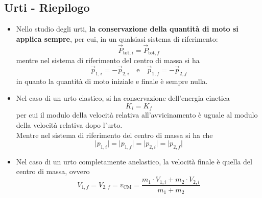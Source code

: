 \documentclass[a4paper]{extarticle}
\begin{document}
\vspace{1em}
\subsection{Urti - Riepilogo}
\begin{itemize}
  \item Nello studio degli urti, \textbf{la conservazione della quantità di moto si applica sempre}, per cui, in un qualsiasi sistema di riferimento:
  \[\boxed{\vec P_{\text{tot}, i} = \vec P_{\text{tot}, f}}\]
  mentre nel sistema di riferimento del centro di massa si ha
  \[\boxed{\vec p_{1,i} = - \vec p_{2,i}} \hspace{1em} \text{e} \hspace{1em} \boxed{\vec p_{1,f} = - \vec p_{2,f}}\]
  in quanto la quantità di moto iniziale e finale è sempre nulla.

  \item Nel caso di un urto elastico, si ha conservazione dell'energia cinetica
  \[\boxed{K_i=K_f}\]
  per cui il modulo della velocità relativa all'avvicinamento è uguale al modulo della velocità relativa dopo l'urto.\\
  Mentre nel sistema di riferimento del centro di massa si ha che
  \[\boxed{\vert p_{1,i} \vert = \vert p_{1,f} \vert = \vert p_{2,i} \vert = \vert p_{2,f} \vert}\]

  \item Nel caso di un urto completamente anelastico, la velocità finale è quella del centro di massa, ovvero
  \[\boxed{V_{1,f} = V_{2,f} = v_{\text{CM}} = \frac{m_1 \cdot V_{1,i} + m_2 \cdot V_{2,i}}{m_1 + m_2}}\]
\end{itemize}
\end{document}
